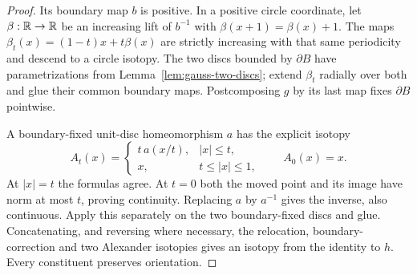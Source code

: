 \begin{proof}
Its boundary map $b$ is positive. In a positive circle coordinate, let
$\beta:\mathbb R\to\mathbb R$ be an increasing lift of $b^{-1}$ with
$\beta(x+1)=\beta(x)+1$. The maps
$\beta_t(x)=(1-t)x+t\beta(x)$ are strictly increasing with that
same periodicity and descend to a circle isotopy. The two discs bounded
by $\partial B$ have parametrizations from
Lemma~\ref{lem:gauss-two-discs}; extend $\beta_t$ radially over both and
glue their common boundary maps. Postcomposing $g$ by its last map
fixes $\partial B$ pointwise.

A boundary-fixed unit-disc homeomorphism $a$ has the explicit isotopy
\begin{equation}\label{eq:gauss-alexander}
 A_t(x)=\begin{cases}t\,a(x/t),&|x|\leq t,\\
 x,&t\leq|x|\leq1,\end{cases}\qquad A_0(x)=x.
\end{equation}
At $|x|=t$ the formulas agree. At $t=0$ both the moved point and its
image have norm at most $t$, proving continuity. Replacing $a$ by
$a^{-1}$ gives the inverse, also continuous. Apply this separately on
the two boundary-fixed discs and glue. Concatenating, and reversing
where necessary, the relocation, boundary-correction and two Alexander
isotopies gives an isotopy from the identity to $h$. Every constituent
preserves orientation.
\end{proof}

